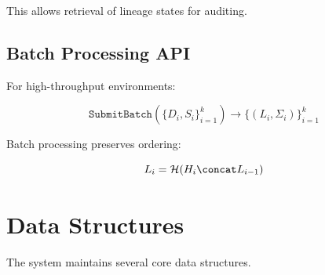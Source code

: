 This allows retrieval of lineage states for auditing.

\subsection{Batch Processing API}

For high-throughput environments:

\begin{equation}
\texttt{SubmitBatch}(\{D_i, S_i\}_{i=1}^{k}) \rightarrow \{(L_i, \Sigma_i)\}_{i=1}^{k}
\end{equation}

Batch processing preserves ordering:

\begin{equation}
L_i = \mathcal{H}(H_i \concat L_{i-1})
\end{equation}

\section{Data Structures}

The system maintains several core data structures.

